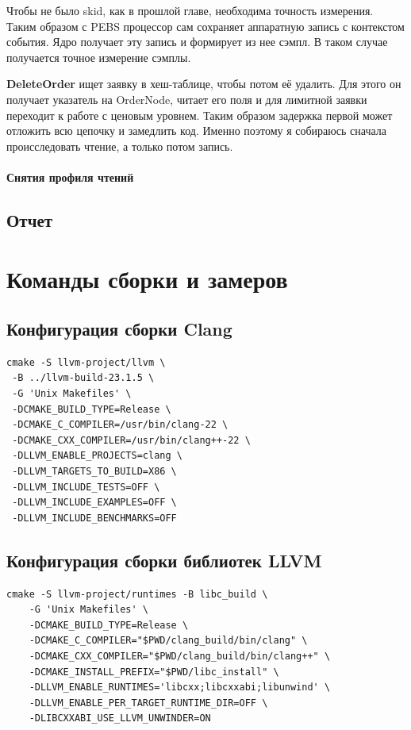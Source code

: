 \documentclass[a4paper,12pt]{article}
\begin{document}
Чтобы не было skid, как в прошлой главе, необходима точность измерения. Таким
образом с PEBS процессор сам сохраняет аппаратную запись с контекстом события.
Ядро получает эту запись и формирует из нее сэмпл. В таком случае получается
точное измерение сэмплы.

\textbf{DeleteOrder} ищет заявку в хеш-таблице, чтобы потом её удалить. Для
этого он получает указатель на OrderNode, читает его поля и для лимитной заявки
переходит к работе с ценовым уровнем. Таким образом задержка первой может
отложить всю цепочку и замедлить код. Именно поэтому я собираюсь сначала
происследовать чтение, а только потом запись.

\paragraph{Снятия профиля чтений}

\subsection{Отчет}


\clearpage
\appendix
\section{Команды сборки и замеров}

\subsection{Конфигурация сборки Clang}
\label{app:cmd-clang}
\begin{lstlisting}
cmake -S llvm-project/llvm \
 -B ../llvm-build-23.1.5 \
 -G 'Unix Makefiles' \
 -DCMAKE_BUILD_TYPE=Release \
 -DCMAKE_C_COMPILER=/usr/bin/clang-22 \
 -DCMAKE_CXX_COMPILER=/usr/bin/clang++-22 \
 -DLLVM_ENABLE_PROJECTS=clang \
 -DLLVM_TARGETS_TO_BUILD=X86 \
 -DLLVM_INCLUDE_TESTS=OFF \
 -DLLVM_INCLUDE_EXAMPLES=OFF \
 -DLLVM_INCLUDE_BENCHMARKS=OFF
\end{lstlisting}

\subsection{Конфигурация сборки библиотек LLVM}
\label{app:cmd-libcxx}
\begin{lstlisting}
cmake -S llvm-project/runtimes -B libc_build \
    -G 'Unix Makefiles' \
    -DCMAKE_BUILD_TYPE=Release \
    -DCMAKE_C_COMPILER="$PWD/clang_build/bin/clang" \
    -DCMAKE_CXX_COMPILER="$PWD/clang_build/bin/clang++" \
    -DCMAKE_INSTALL_PREFIX="$PWD/libc_install" \
    -DLLVM_ENABLE_RUNTIMES='libcxx;libcxxabi;libunwind' \
    -DLLVM_ENABLE_PER_TARGET_RUNTIME_DIR=OFF \
    -DLIBCXXABI_USE_LLVM_UNWINDER=ON
\end{lstlisting}
\end{document}
